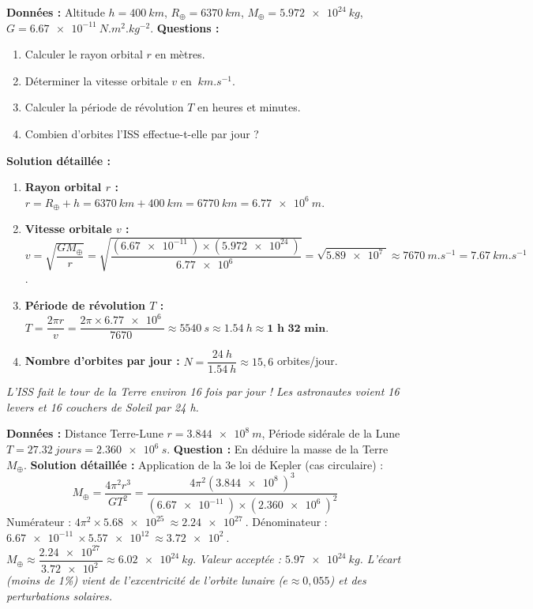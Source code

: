 \documentclass[11pt]{article}
\begin{document}
\begin{exoresolu}
\textbf{Données :} Altitude $h = \SI{400}{km}$, $R_\oplus = \SI{6370}{km}$, $M_\oplus = \SI{5,972e24}{kg}$, $G = \SI{6,67e-11}{N.m^2.kg^{-2}}$.
\textbf{Questions :}
\begin{enumerate}
    \item Calculer le rayon orbital $r$ en mètres.
    \item Déterminer la vitesse orbitale $v$ en $\SI{}{km.s^{-1}}$.
    \item Calculer la période de révolution $T$ en heures et minutes.
    \item Combien d'orbites l'ISS effectue-t-elle par jour ?
\end{enumerate}
\tcblower
\textbf{Solution détaillée :}
\begin{enumerate}
    \item \textbf{Rayon orbital $r$ :}
    $r = R_\oplus + h = \SI{6370}{km} + \SI{400}{km} = \SI{6770}{km} = \SI{6,77e6}{m}$.
    \item \textbf{Vitesse orbitale $v$ :}
    $v = \sqrt{\dfrac{G M_\oplus}{r}} = \sqrt{\dfrac{(\SI{6,67e-11}{}) \times (\SI{5,972e24}{})}{\SI{6,77e6}{}}}
    = \sqrt{\SI{5,89e7}{}} \approx \SI{7670}{m.s^{-1}} = \SI{7,67}{km.s^{-1}}$.
    \item \textbf{Période de révolution $T$ :}
    $T = \dfrac{2\pi r}{v} = \dfrac{2\pi \times \SI{6,77e6}{}}{\SI{7670}{}} \approx \SI{5540}{s} \approx \SI{1,54}{h} \approx \textbf{1 h 32 min}$.
    \item \textbf{Nombre d'orbites par jour :} $N = \dfrac{\SI{24}{h}}{\SI{1,54}{h}} \approx 15,6$ orbites/jour.
\end{enumerate}
\textit{L'ISS fait le tour de la Terre environ 16 fois par jour ! Les astronautes voient 16 levers et 16 couchers de Soleil par 24 h.}
\end{exoresolu}

\begin{exoresolu}
\textbf{Données :} Distance Terre-Lune $r = \SI{3,844e8}{m}$, Période sidérale de la Lune $T = \SI{27,32}{jours} = \SI{2,360e6}{s}$.
\textbf{Question :} En déduire la masse de la Terre $M_\oplus$.
\tcblower
\textbf{Solution détaillée :}
Application de la 3e loi de Kepler (cas circulaire) :
\[
M_\oplus = \frac{4\pi^2 r^3}{G T^2}
= \frac{4\pi^2 (\SI{3,844e8}{})^3}{(\SI{6,67e-11}{}) \times (\SI{2,360e6}{})^2}
\]
Numérateur : $4\pi^2 \times \SI{5,68e25}{} \approx \SI{2,24e27}{}$.
Dénominateur : $\SI{6,67e-11}{} \times \SI{5,57e12}{} \approx \SI{3,72e2}{}$.
$M_\oplus \approx \dfrac{\SI{2,24e27}{}}{\SI{3,72e2}{}} \approx \SI{6,02e24}{kg}$.
\textit{Valeur acceptée : $\SI{5,97e24}{kg}$. L'écart (moins de 1\%) vient de l'excentricité de l'orbite lunaire ($e \approx 0,055$) et des perturbations solaires.}
\end{exoresolu}
\end{document}
